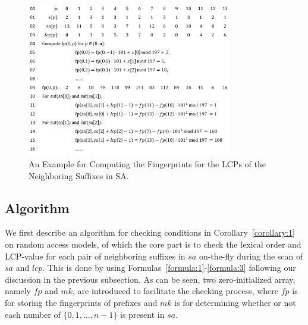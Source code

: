 \documentclass[10pt,journal,compsoc]{IEEEtran}
\begin{document}
\begin{figure}
	\centering
	\label{fig:example}
	\includegraphics[width = 0.8\textwidth]{example}
	\caption{An Example for Computing the Fingerprints for the LCPs of the Neighboring Suffixes in SA.}	
\end{figure}

\subsection{Algorithm} \label{sec:method1:algorithm}

We first describe an algorithm for checking conditions in Corollary~\ref{corollary:1} on random access models, of which the core part is to check the lexical order and LCP-value for each pair of neighboring suffixes in $sa$ on-the-fly during the scan of $sa$ and $lcp$. This is done by using Formulas~\ref{formula:1}-\ref{formula:3} following our discussion in the previous subsection. As can be seen, two zero-initialized array, namely $fp$ and $mk$, are introduced to facilitate the checking process, where $fp$ is for storing the fingerprints of prefixes and $mk$ is for determining whether or not each number of $\{0, 1, ..., n - 1\}$ is present in $sa$.
\end{document}

